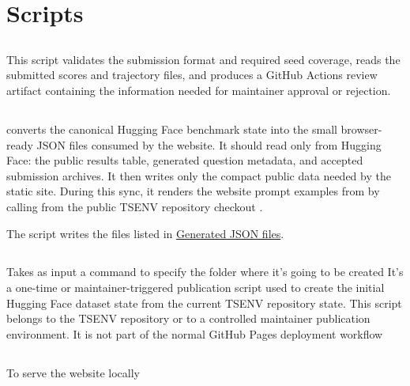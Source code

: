 \documentclass[11pt]{article}
\begin{document}
\section{Scripts}
\subsection*{}
This script validates the submission format and required seed coverage, reads the submitted scores and trajectory files, and produces a GitHub Actions review artifact containing the information needed for maintainer approval or rejection.

\subsection*{}

 converts the canonical Hugging Face benchmark state into the small browser-ready JSON files consumed by the website.
It should read only from Hugging Face: the public results table, generated question metadata, and accepted submission archives.
It then writes only the compact public data needed by the static site.
During this sync, it renders the website prompt examples from  by calling  from the public TSENV repository checkout .

The script writes the files listed in \hyperref[sec:website-generated-json-file-list]{Generated JSON files}.

\subsection*{}
Takes as input a command  to specify the folder where it's going to be created
It's a one-time or maintainer-triggered publication script used to create the initial Hugging Face dataset state from the current TSENV repository state. 
This script belongs to the TSENV repository or to a controlled maintainer publication environment.
It is not part of the normal GitHub Pages deployment workflow
\subsection*{}
To serve the website locally
\end{document}
